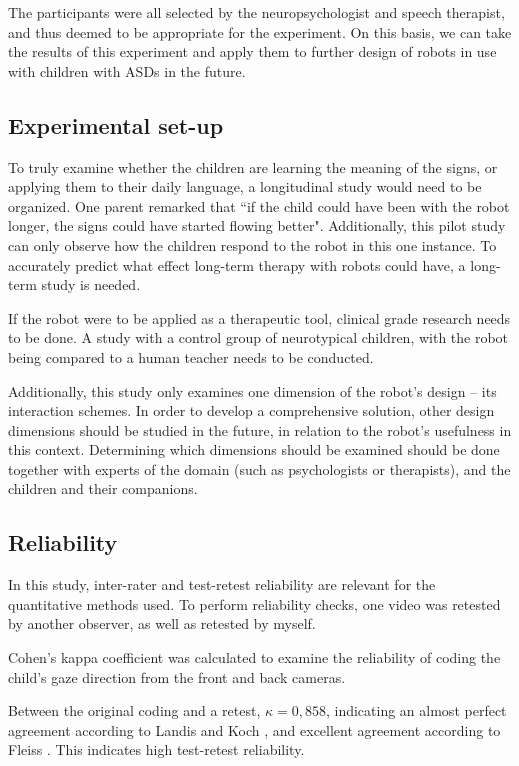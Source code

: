 The participants were all selected by the neuropsychologist and speech therapist, and thus deemed to be appropriate for the experiment. On this basis, we can take the results of this experiment and apply them to further design of robots in use with children with ASDs in the future.


\subsection{Experimental set-up}

To truly examine whether the children are learning the meaning of the signs, or applying them to their daily language, a longitudinal study would need to be organized. One parent remarked that ``if the child could have been with the robot longer, the signs could have started flowing better". Additionally, this pilot study can only observe how the children respond to the robot in this one instance. To accurately predict what effect long-term therapy with robots could have, a long-term study is needed.

If the robot were to be applied as a therapeutic tool, clinical grade research needs to be done. A study with a control group of neurotypical children, with the robot being compared to a human teacher needs to be conducted.

Additionally, this study only examines one dimension of the robot's design – its interaction schemes. In order to develop a comprehensive solution, other design dimensions should be studied in the future, in relation to the robot's usefulness in this context. Determining which dimensions should be examined should be done together with experts of the domain (such as psychologists or therapists), and the children and their companions. 


\subsection{Reliability}

In this study, inter-rater and test-retest reliability are relevant for the quantitative methods used. To perform reliability checks, one video was retested by another observer, as well as retested by myself.

Cohen's kappa coefficient was calculated to examine the reliability of coding the child's gaze direction from the front and back cameras. 

Between the original coding and a retest, $\kappa = 0,858$, indicating an almost perfect agreement according to Landis and Koch \cite{landis1977measurement}, and excellent agreement according to Fleiss \cite{fleiss2013statistical}. This indicates high test-retest reliability. 

